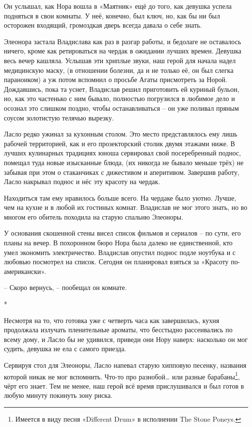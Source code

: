\documentclass[
  a5paperpaper,
  DIV=11,
  numbers=noendperiod]{scrreprt}
\begin{document}
Он услышал, как Нора вошла в «Маятник» ещё до того, как девушка успела
подняться в свои комнаты. У неё, конечно, был ключ, но, как бы ни был
осторожен входящий, громоздкая дверь всегда давала о себе знать.

Элеонора застала Владислава как раз в разгар работы, и бедолаге не
оставалось ничего, кроме как ретироваться на чердак в ожидании лучших
времен. Девушка весь вечер кашляла. Услышав эти хриплые звуки, наш герой
для начала надел медицинскую маску, (в отношении болезни, да и не только
её, он был слегка параноиком) а уж потом вспомнил о просьбе Агаты
присмотреть за Норой. Дождавшись, пока та уснет, Владислав решил
приготовить ей куриный бульон, но, как это частенько с ним бывало,
полностью погрузился в любимое дело и осознал это слишком поздно, чтобы
останавливаться -- он уже поливал пряным соусом золотистую телячью
вырезку.

Ласло редко ужинал за кухонным столом. Это место представлялось ему лишь
рабочей территорией, как и его прозекторский столик двумя этажами ниже.
В лучших кулинарных традициях юноша сервировал свой посеребренный
поднос, помещал туда новые изысканные блюда, (их никогда не бывало
меньше трёх) не забывая при этом о стаканчиках с дижестивом и
аперитивом. Завершив работу, Ласло накрывал поднос и нёс эту красоту на
чердак.

Находиться там ему нравилось больше всего. На чердаке было уютно. Лучше,
чем на кухне и в любой их гостиных комнат. Владислав не мог этого знать,
но во многом его обитель походила на старую спальню Элеоноры.

У основания скошенной стены висел список фильмов и сериалов -- по сути,
его планы на вечер. В похоронном бюро Нора была далеко не единственной,
кто умел экономить электричество. Владислав опустил поднос подле
ноутбука и с любовью посмотрел на список. Сегодня он планировал взяться
за «Красоту по-американски».

-- Скоро вернусь, -- пообещал он комнате.

*

Несмотря на то, что готовка уже с четверть часа как завершилась, кухня
продолжала излучать пленительные ароматы, что бесстыдно рассеивались по
всему дому, и Ласло бы не удивился, приведи они Нору наверх: насколько
он мог судить, девушка не ела с самого приезда.

Сервируя стол для Элеоноры, Ласло напевал старую хипповую песенку,
названия которой никак не мог вспомнить. Что-то про разнобой\ldots{} или
разные барабаны\footnote{Имеется в виду песня «Different Drum» в
  исполнении The Stone Poneys.}, чёрт его знает. Тем не менее, наш герой
всё время прислушивался и был готов в любую минуту покинуть зону риска.
\end{document}
